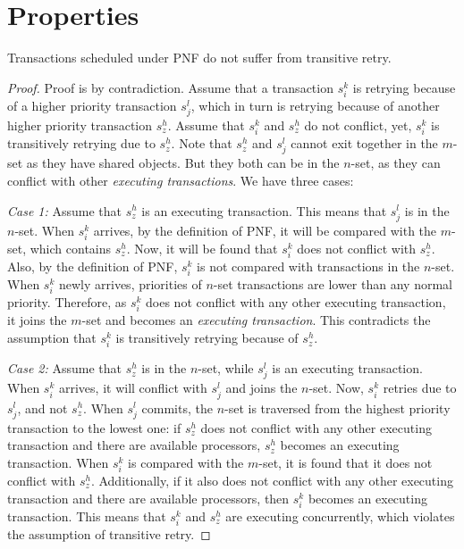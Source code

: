 \section{Properties\label{pnf properties sec}}
%
\begin{clm}\label{PNF-transitive-retry}
Transactions scheduled under PNF do not suffer from transitive
retry.
\end{clm}
\begin{proof}\normalfont
Proof is by contradiction. Assume that a transaction $s_{i}^{k}$
is retrying because of a higher priority transaction $s_{j}^{l}$, which
in turn is retrying because of another higher priority transaction
$s_{z}^{h}$. Assume that $s_{i}^{k}$ and $s_{z}^{h}$ do not conflict, yet,
$s_{i}^{k}$ is transitively retrying due to $s_{z}^{h}$. 
Note that $s_{z}^{h}$ and $s_{j}^{l}$ cannot exit together in
the $m$-set as they have shared objects. But they both can
be in the $n$-set, as they can conflict with other \emph{executing
transactions}. We have three cases:

\textit{Case 1:} Assume that $s_{z}^{h}$ is an executing transaction. This means that $s_{j}^{l}$ is in the $n$-set. When $s_{i}^{k}$ arrives, by the definition of PNF, it will be compared with the $m$-set, which contains $s_{z}^{h}$. Now, it will be found that $s_{i}^{k}$ does not conflict with $s_{z}^{h}$. Also, by the definition of PNF, $s_{i}^{k}$ is not compared with transactions in the $n$-set. When $s_i^k$ newly arrives, priorities of $n$-set transactions are lower than any normal priority. Therefore, as $s_{i}^{k}$ does not conflict with any other executing
transaction, it joins the $m$-set and becomes an \emph{executing
transaction}. This contradicts the assumption that $s_{i}^{k}$
is transitively retrying because of $s_{z}^{h}$.

\textit{Case 2:} Assume that $s_{z}^{h}$ is in the $n$-set, while $s_{j}^{l}$
is an executing transaction. When $s_{i}^{k}$ arrives, it will conflict
with $s_{j}^{l}$ and joins the $n$-set. Now, $s_{i}^{k}$
retries due to $s_{j}^{l}$, and not $s_{z}^{h}$. When $s_{j}^{l}$ commits,
the $n$-set is traversed from the highest priority transaction
to the lowest one: if $s_{z}^{h}$ does not conflict with any other
executing transaction and there are available processors, $s_{z}^{h}$
becomes an executing transaction. When $s_{i}^{k}$ is compared with 
the $m$-set, it is found that it does not conflict with $s_{z}^{h}$. Additionally, if it also does not conflict with any other executing transaction and there are available processors, then $s_{i}^{k}$ becomes an executing
transaction. This means that $s_{i}^{k}$ and $s_{z}^{h}$ are executing
concurrently, which violates the assumption of transitive retry.


\end{proof}
